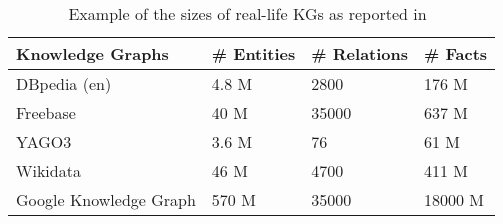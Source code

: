 \begin{table}[t]
\centering


\begin{tabular}{@{}llll@{}}
\toprule
Knowledge Graphs       & \# Entities & \# Relations & \# Facts \\ \midrule
DBpedia (en)%
					   &      4.8 M  &       2800       &   176 M       \\
Freebase			   &     40 M    &      35000   &    637 M \\
YAGO3%
 &      3.6 M   &       76   &   61 M  \\
Wikidata%
&      46 M   &       4700   &   411 M  \\
Google Knowledge Graph &      570 M  &       35000  &   18000 M\\ \bottomrule
\end{tabular}
\caption{Example of the sizes of real-life KGs as reported in~\cite{Nickel2015ARO,DBLP:journals/semweb/Paulheim17}}
\label{tab:kgs}

\end{table}